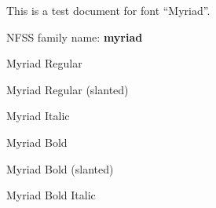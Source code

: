 \documentclass{jsarticle}
\begin{document}
{This is a test document for font ``Myriad''.}

NFSS family name: {\bfseries myriad}

{\selectfont Myriad Regular}\par
{\selectfont Myriad Regular (slanted)}\par
{\selectfont Myriad Italic}\par
{\selectfont Myriad Bold}\par
{\selectfont Myriad Bold (slanted)}\par
{\selectfont Myriad Bold Italic}\par
\end{document}
